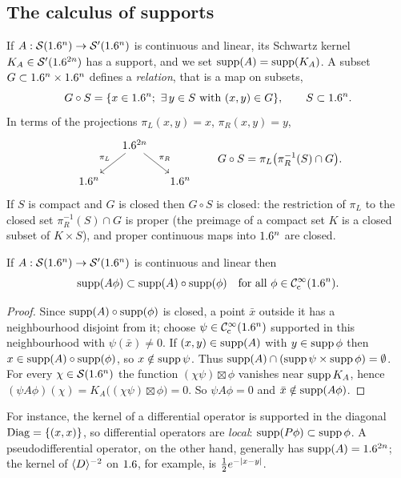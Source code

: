 \subsection{The calculus of supports}
If $A:\mathcal{S}(1.6^n)\to\mathcal{S}'(1.6^n)$ is continuous and linear, its Schwartz kernel
$K_A\in\mathcal{S}'(1.6^{2n})$ has a support, and we set $\operatorname{supp}(A)=\operatorname{supp}(K_A)$. A
subset $G\subset1.6^n\times1.6^n$ defines a \emph{relation}, that is a map on
subsets,
\begin{equation*}
  G\circ S=\{x\in1.6^n;\ \exists\,y\in S\text{ with }(x,y)\in G\},
  \qquad S\subset1.6^n.
\end{equation*}
In terms of the projections $\pi_L(x,y)=x$, $\pi_R(x,y)=y$,
\begin{equation*}
  \begin{tikzcd}[column sep=small]
    & \R^{2n}\arrow[dl,"\pi_L"']\arrow[dr,"\pi_R"] & \\
    \R^n & & \R^n
  \end{tikzcd}
  \qquad
  G\circ S=\pi_L\bigl(\pi_R^{-1}(S)\cap G\bigr).
\end{equation*}
If $S$ is compact and $G$ is closed then $G\circ S$ is closed: the restriction
of $\pi_L$ to the closed set $\pi_R^{-1}(S)\cap G$ is proper (the preimage of
a compact set $K$ is a closed subset of $K\times S$), and proper continuous
maps into $1.6^n$ are closed.

\begin{proposition}\label{microlocal:prop:supports}
  If $A:\mathcal{S}(1.6^n)\to\mathcal{S}'(1.6^n)$ is continuous and linear then
  \begin{equation*}
    \operatorname{supp}(A\phi)\subset\operatorname{supp}(A)\circ\operatorname{supp}(\phi)\quad\text{for all }\phi\in\mathcal{C}^\infty_{\mathrm{c}}(1.6^n).
  \end{equation*}
\end{proposition}
\begin{proof}
  Since $\operatorname{supp}(A)\circ\operatorname{supp}(\phi)$ is closed, a point $\bar x$ outside it has
  a neighbourhood disjoint from it; choose $\psi\in\mathcal{C}^\infty_{\mathrm{c}}(1.6^n)$ supported in
  this neighbourhood with $\psi(\bar x)\ne0$. If $(x,y)\in\operatorname{supp}(A)$ with
  $y\in\operatorname{supp}\phi$ then $x\in\operatorname{supp}(A)\circ\operatorname{supp}(\phi)$, so $x\notin\operatorname{supp}\psi$.
  Thus $\operatorname{supp}(A)\cap(\operatorname{supp}\psi\times\operatorname{supp}\phi)=\emptyset$. For every
  $\chi\in\mathcal{S}(1.6^n)$ the function $(\chi\psi)\boxtimes\phi$ vanishes near
  $\operatorname{supp} K_A$, hence
  $(\psi A\phi)(\chi)=K_A\bigl((\chi\psi)\boxtimes\phi\bigr)=0$. So
  $\psi A\phi=0$ and $\bar x\notin\operatorname{supp}(A\phi)$.
\end{proof}

For instance, the kernel of a differential operator is supported in the
diagonal $\operatorname{Diag}=\{(x,x)\}$, so differential operators are \emph{local}:
$\operatorname{supp}(P\phi)\subset\operatorname{supp}\phi$. A pseudodifferential operator, on the
other hand, generally has $\operatorname{supp}(A)=1.6^{2n}$; the kernel of $\langle D\rangle^{-2}$ on
$1.6$, for example, is $\frac12e^{-\lvert x-y\rvert}$.


